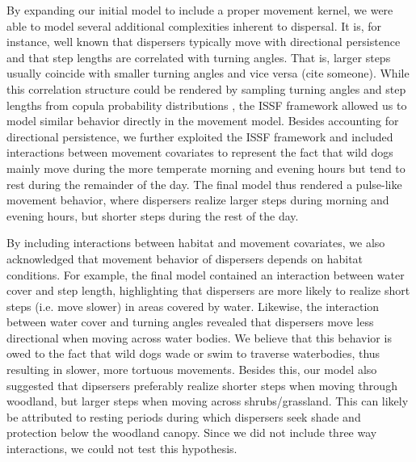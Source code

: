\documentclass[abstract=on,10pt,a4paper,bibliography=totocnumbered]{article}
\begin{document}
By expanding our initial model to include a proper movement kernel, we were able
to model several additional complexities inherent to dispersal. It is, for
instance, well known that dispersers typically move with directional persistence
and that step lengths are correlated with turning angles. That is, larger steps
usually coincide with smaller turning angles and vice versa (cite someone).
While this correlation structure could be rendered by sampling turning angles
and step lengths from copula probability distributions \citep{Hodel.2021}, the
ISSF framework allowed us to model similar behavior directly in the movement
model. Besides accounting for directional persistence, we further exploited the
ISSF framework and included interactions between movement covariates to
represent the fact that wild dogs mainly move during the more temperate morning
and evening hours but tend to rest during the remainder of the day. The final
model thus rendered a pulse-like movement behavior, where dispersers realize
larger steps during morning and evening hours, but shorter steps during the rest
of the day.

By including interactions between habitat and movement covariates, we also
acknowledged that movement behavior of dispersers depends on habitat conditions.
For example, the final model contained an interaction between water cover and
step length, highlighting that dispersers are more likely to realize short steps
(i.e. move slower) in areas covered by water. Likewise, the interaction between
water cover and turning angles revealed that dispersers move less directional
when moving across water bodies. We believe that this behavior is owed to the
fact that wild dogs wade or swim to traverse waterbodies, thus resulting in
slower, more tortuous movements. Besides this, our model also suggested that
dipsersers preferably realize shorter steps when moving through woodland, but
larger steps when moving across shrubs/grassland. This can likely be attributed
to resting periods during which dispersers seek shade and protection below the
woodland canopy. Since we did not include three way interactions, we could not
test this hypothesis.
\end{document}

